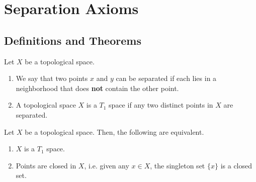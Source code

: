 \chapter{Separation Axioms}
\section{Definitions and Theorems}
\begin{defbox}
    \begin{definition}[\(T_1\) Space]
        Let \(X\) be a {\color{mathif}topological space}.
        \begin{enumerate}
            \item We say that two {\color{mathobj}points} \(x\) and \(y\) can be {\color{maththen}separated} if each lies in a {\color{mathif}neighborhood} that does \textbf{not} contain the other point.

            \item A {\color{mathobj}topological space} \(X\) is a {\color{maththen}\(T_1\) space} if any two distinct points in \(X\) are {\color{mathif}separated}.
        \end{enumerate}
    \end{definition}
\end{defbox}
%
\begin{thmbox}
    \begin{proposition}
        Let \(X\) be a {\color{mathif}topological space}. Then, the following are {\color{mathrem}equivalent}.
        \begin{enumerate}
            \item \(X\) is a {\color{maththen}\(T_1\) space}.
            \item {\color{mathif}Points} are {\color{maththen}closed} in \(X\), i.e. given any \(x \in X\), the {\color{mathif}singleton} set \(\{x\}\) is a {\color{maththen}closed} set.
        \end{enumerate}
    \end{proposition}
\end{thmbox}
%
